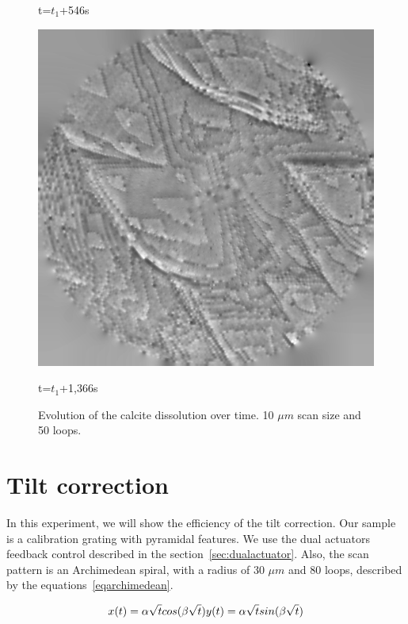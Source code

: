 \begin{figure}[!ht]
    \caption*{t=$t_1$+546s}
\endminipage\hfill
{}%
    \includegraphics[width=\linewidth]{images/006_X10s50l10m_MOv2_290.png}
    \caption*{t=$t_1$+1,366s} 

\endminipage
\caption{Evolution of the calcite dissolution over time. 10 $\mu m$ scan size and 50 loops.} \label{fig:cdtotal}

\end{figure}


\section{Tilt correction}

In this experiment, we will show the efficiency of the tilt correction. Our sample is a calibration grating with pyramidal features. We use the dual actuators feedback control described in the section~\ref{sec:dualactuator}. Also, the scan pattern is an Archimedean spiral, with a radius of 30 $\mu m$ and 80 loops, described by the equations~\ref{eqarchimedean}.

\begin{equation}\label{eqarchimedean}
x(t)= \alpha \sqrt{t} cos(\beta \sqrt{t})\\
y(t)= \alpha \sqrt{t} sin(\beta \sqrt{t})
\end{equation}

